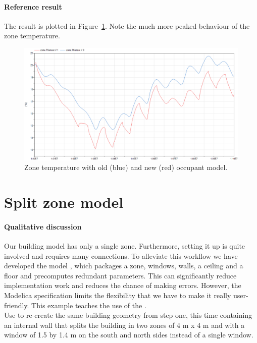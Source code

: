 \documentclass[10pt,a4paper]{article}
\begin{document}
\paragraph{Reference result}
The result 
is plotted in Figure~\ref{fig:res4}.
Note the much more peaked behaviour of the zone temperature.



\begin{figure}
\centering
\includegraphics[scale=0.6]{Example4.png}
\caption{Zone temperature with old (blue) and new (red) occupant model.}
\label{fig:res4}
\end{figure}


\section{Split zone model}
\paragraph{Qualitative discussion}
Our building model has only a single zone. 
Furthermore, setting it up is quite involved and requires many connections.
To alleviate this workflow we have developed the model
, which packages a zone, 
windows, walls, a ceiling and a floor and precomputes redundant parameters.
This can significantly reduce implementation work and reduces the chance of making 
errors. 
However, the Modelica specification limits the flexibility that we have to make it really
user-friendly.
This example teaches the use of the .\\

Use  to re-create the same building geometry from
step one, this time containing an internal wall that splits the building in two
zones of 4 m x 4 m and with a window of 1.5 by 1.4 m on the south and north sides instead of a single window.
\end{document}
